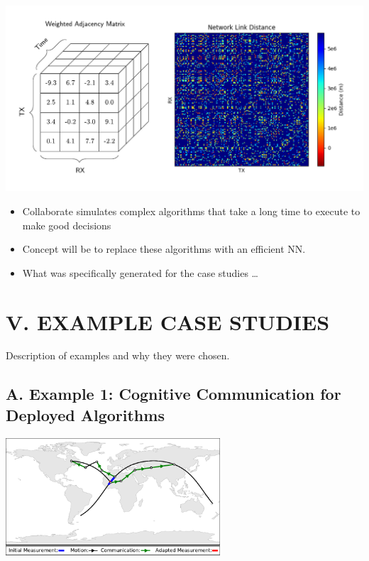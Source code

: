 \documentclass[11pt]{article}
\begin{document}
\begin{center}
\includegraphics[width=\textwidth]{./images/weighted_combined.pdf}
\end{center}

\begin{itemize}
\item Collaborate simulates complex algorithms that take a long time to execute to
make good decisions

\item Concept will be to replace these algorithms with an efficient NN.

\item What was specifically generated for the case studies \ldots{}
\end{itemize}

\section*{V. EXAMPLE CASE STUDIES}
\label{sec:orgdbcb83d}

Description of examples and why they were chosen.

\subsection*{A. Example 1: Cognitive Communication for Deployed Algorithms}
\label{sec:orgb4fc8a4}


\begin{center}
\includegraphics[width=0.6\textwidth]{./images/loop.pdf}
\end{center}
\end{document}
